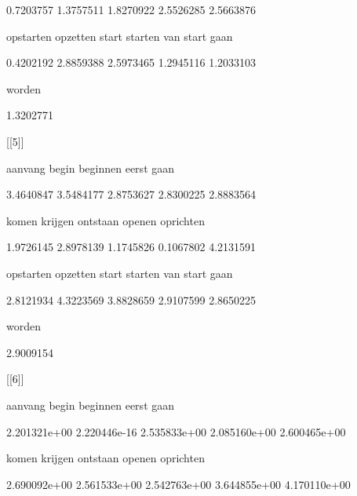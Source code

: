      0.7203757      1.3757511      1.8270922      2.5526285      2.5663876 



     opstarten       opzetten          start        starten van start gaan 



     0.4202192      2.8859388      2.5973465      1.2945116      1.2033103 



        worden 



     1.3202771 



[[5]]



       aanvang          begin       beginnen          eerst           gaan 



     3.4640847      3.5484177      2.8753627      2.8300225      2.8883564 



         komen        krijgen       ontstaan         openen      oprichten 



     1.9726145      2.8978139      1.1745826      0.1067802      4.2131591 



     opstarten       opzetten          start        starten van start gaan 



     2.8121934      4.3223569      3.8828659      2.9107599      2.8650225 



        worden 



     2.9009154 



[[6]]



       aanvang          begin       beginnen          eerst           gaan 



  2.201321e+00   2.220446e-16   2.535833e+00   2.085160e+00   2.600465e+00 



         komen        krijgen       ontstaan         openen      oprichten 



  2.690092e+00   2.561533e+00   2.542763e+00   3.644855e+00   4.170110e+00 



